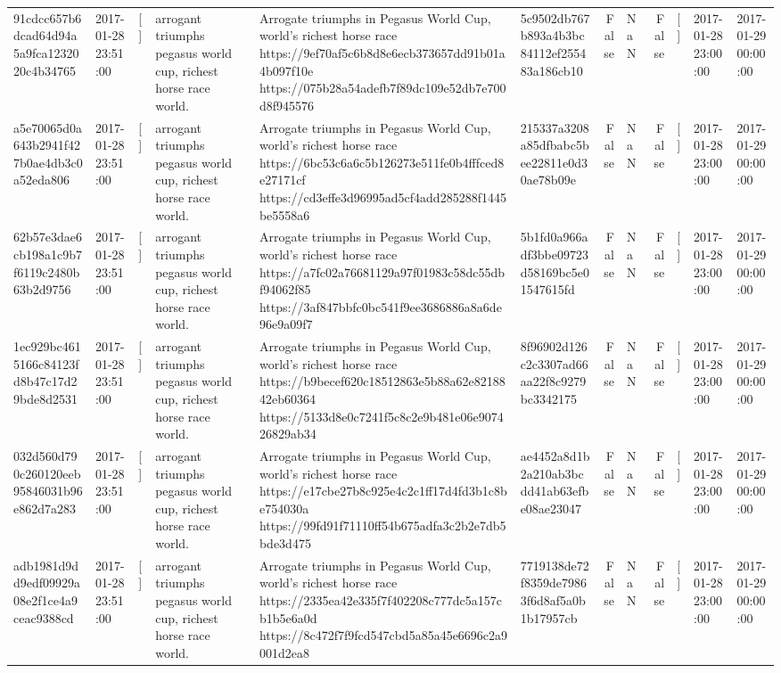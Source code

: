 \begin{tabular}{llllllrlrlll}
91cdcc657b6dcad64d94a5a9fca1232020c4b34765 & 2017-01-28 23:51:00 & [] & arrogant triumphs pegasus world cup, richest horse race world. & Arrogate triumphs in Pegasus World Cup, world's richest horse race https://9ef70af5c6b8d8e6ecb373657dd91b01a4b097f10e https://075b28a54adefb7f89dc109e52db7e700d8f945576 & 5c9502db767b893a4b3bc84112ef255483a186cb10 & False & NaN & False & [] & 2017-01-28 23:00:00 & 2017-01-29 00:00:00 \\
a5e70065d0a643b2941f427b0ae4db3c0a52eda806 & 2017-01-28 23:51:00 & [] & arrogant triumphs pegasus world cup, richest horse race world. & Arrogate triumphs in Pegasus World Cup, world's richest horse race https://6bc53c6a6c5b126273e511fe0b4fffced8e27171cf https://cd3effe3d96995ad5cf4add285288f1445be5558a6 & 215337a3208a85dfbabc5bee22811e0d30ae78b09e & False & NaN & False & [] & 2017-01-28 23:00:00 & 2017-01-29 00:00:00 \\
62b57e3dae6cb198a1c9b7f6119c2480b63b2d9756 & 2017-01-28 23:51:00 & [] & arrogant triumphs pegasus world cup, richest horse race world. & Arrogate triumphs in Pegasus World Cup, world's richest horse race https://a7fc02a76681129a97f01983c58dc55dbf94062f85 https://3af847bbfc0bc541f9ee3686886a8a6de96e9a09f7 & 5b1fd0a966adf3bbe09723d58169bc5e01547615fd & False & NaN & False & [] & 2017-01-28 23:00:00 & 2017-01-29 00:00:00 \\
1ec929bc4615166c84123fd8b47c17d29bde8d2531 & 2017-01-28 23:51:00 & [] & arrogant triumphs pegasus world cup, richest horse race world. & Arrogate triumphs in Pegasus World Cup, world's richest horse race https://b9becef620c18512863e5b88a62e8218842eb60364 https://5133d8e0c7241f5c8c2e9b481e06e907426829ab34 & 8f96902d126c2c3307ad66aa22f8c9279bc3342175 & False & NaN & False & [] & 2017-01-28 23:00:00 & 2017-01-29 00:00:00 \\
032d560d790c260120eeb95846031b96e862d7a283 & 2017-01-28 23:51:00 & [] & arrogant triumphs pegasus world cup, richest horse race world. & Arrogate triumphs in Pegasus World Cup, world's richest horse race https://e17cbe27b8c925e4c2c1ff17d4fd3b1c8be754030a https://99fd91f71110ff54b675adfa3c2b2e7db5bde3d475 & ae4452a8d1b2a210ab3bcdd41ab63efbe08ae23047 & False & NaN & False & [] & 2017-01-28 23:00:00 & 2017-01-29 00:00:00 \\
adb1981d9dd9edf09929a08e2f1ce4a9ceac9388cd & 2017-01-28 23:51:00 & [] & arrogant triumphs pegasus world cup, richest horse race world. & Arrogate triumphs in Pegasus World Cup, world's richest horse race https://2335ea42e335f7f402208c777dc5a157cb1b5e6a0d https://8c472f7f9fcd547cbd5a85a45e6696c2a9001d2ea8 & 7719138de72f8359de79863f6d8af5a0b1b17957cb & False & NaN & False & [] & 2017-01-28 23:00:00 & 2017-01-29 00:00:00 \\

\end{tabular}
